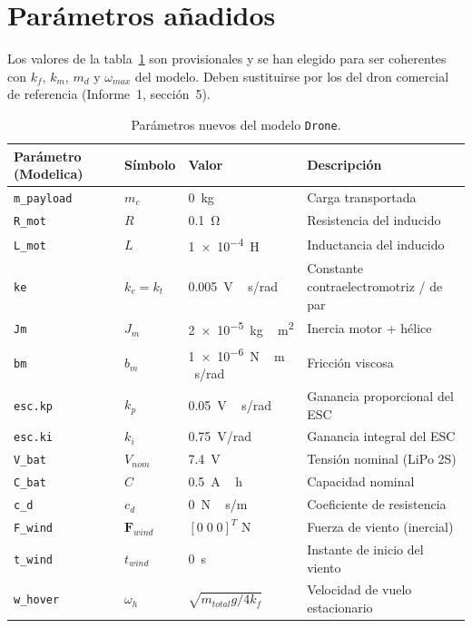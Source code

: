 \section{Parámetros añadidos}
\label{sec:parametros}

Los valores de la tabla~\ref{tab:parametros} son provisionales y se han elegido para
ser coherentes con $k_f$, $k_m$, $m_d$ y $\omega_{max}$ del modelo. Deben sustituirse
por los del dron comercial de referencia (Informe~1, sección~5).

\begin{table}[h]
\centering
\begin{tabular}{llll}
\toprule
Parámetro (Modelica) & Símbolo & Valor & Descripción \\
\midrule
\texttt{m\_payload}  & $m_c$      & \SI{0}{kg}              & Carga transportada \\
\texttt{R\_mot}      & $R$        & \SI{0.1}{\ohm}          & Resistencia del inducido \\
\texttt{L\_mot}      & $L$        & \SI{1e-4}{H}            & Inductancia del inducido \\
\texttt{ke}          & $k_e = k_t$ & \SI{0.005}{V\,s/rad}   & Constante contraelectromotriz / de par \\
\texttt{Jm}          & $J_m$      & \SI{2e-5}{kg\,m^2}      & Inercia motor + hélice \\
\texttt{bm}          & $b_m$      & \SI{1e-6}{N\,m\,s/rad}  & Fricción viscosa \\
\texttt{esc.kp}      & $k_p$      & \SI{0.05}{V\,s/rad}     & Ganancia proporcional del ESC \\
\texttt{esc.ki}      & $k_i$      & \SI{0.75}{V/rad}        & Ganancia integral del ESC \\
\texttt{V\_bat}      & $V_{nom}$  & \SI{7.4}{V}             & Tensión nominal (LiPo 2S) \\
\texttt{C\_bat}      & $C$        & \SI{0.5}{A\,h}          & Capacidad nominal \\
\texttt{c\_d}        & $c_d$      & \SI{0}{N\,s/m}          & Coeficiente de resistencia \\
\texttt{F\_wind}     & $\mathbf{F}_{wind}$ & $[0\;0\;0]^T$ \si{N} & Fuerza de viento (inercial) \\
\texttt{t\_wind}     & $t_{wind}$ & \SI{0}{s}               & Instante de inicio del viento \\
\texttt{w\_hover}    & $\omega_h$ & $\sqrt{m_{total} g / 4k_f}$ & Velocidad de vuelo estacionario \\
\bottomrule
\end{tabular}
\caption{Parámetros nuevos del modelo \texttt{Drone}.}
\label{tab:parametros}
\end{table}

